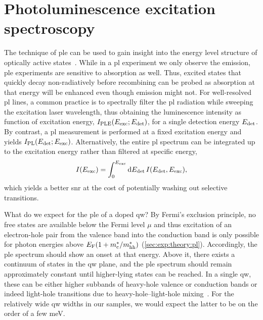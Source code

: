 \section{Photoluminescence excitation spectroscopy}\label{sec:exp:observations:ple}
The technique of \acrfull{ple} can be used to gain insight into the energy level structure of optically active states~\cite{Gilliland1997}.
While in a \gls{pl} experiment we only observe the emission, \gls{ple} experiments are sensitive to absorption as well.
Thus, excited states that quickly decay non-radiatively before recombining can be probed as absorption at that energy will be enhanced even though emission might not.
For well-resolved \gls{pl} lines, a common practice is to spectrally filter the \gls{pl} radiation while sweeping the excitation laser wavelength, thus obtaining the luminescence intensity as function of excitation energy, $I_{\mathrm{PLE}}(E_{\mathrm{exc}}; E_{\mathrm{det}})$, for a single detection energy $E_{\mathrm{det}}$.
By contrast, a \gls{pl} measurement is performed at a fixed excitation energy and yields $I_{\mathrm{PL}}(E_{\mathrm{det}}; E_{\mathrm{exc}})$.
Alternatively, the entire \gls{pl} spectrum can be integrated up to the excitation energy rather than filtered at specific energy,
\begin{equation}\label{eq:exp:ple}
    I(E_{\mathrm{exc}}) = \int_{0}^{E_{\mathrm{exc}}}\dd{E_{\ensuremath{\mathrm{det}}}} I(E_{\mathrm{det}}, E_{\mathrm{exc}}),
\end{equation}
which yields a better \gls{snr} at the cost of potentially washing out selective transitions.

What do we expect for the \gls{ple} of a doped \gls{qw}?
By Fermi's exclusion principle, no free states are available below the Fermi level $\mu$ and thus excitation of an electron-hole pair from the valence band into the conduction band is only possible for photon energies above $E_{\mathrm{F}}(1 + m_{\mathrm{c}}^\ast/m_{\mathrm{hh}}^\ast)$ (\cref{sec:exp:theory:pl}).
Accordingly, the \gls{ple} spectrum should show an onset at that energy.
Above it, there exists a continuum of states in the \gls{qw} plane, and the \gls{ple} spectrum should remain approximately constant until higher-lying states can be reached.
In a single \gls{qw}, these can be either higher subbands of heavy-hole valence or conduction bands or indeed light-hole transitions due to heavy-hole--light-hole mixing~\cite{Bastard1984,Miller1985b,Laruelle1988,Reynolds1988,ElKhalifi1989}.
For the relatively wide \gls{qw} widths in our samples, we would expect the latter to be on the order of a few \unit{\milli\electronvolt}.

